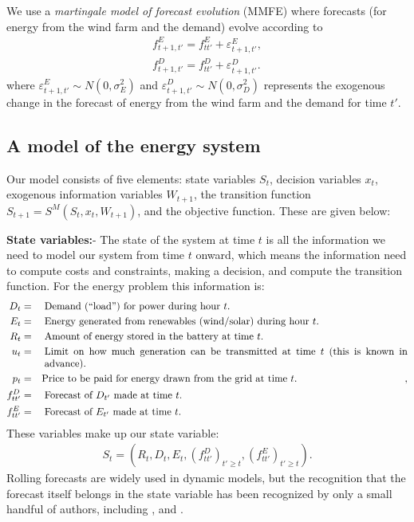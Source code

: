 \documentclass[11pt,oneside,fleqn,reqno,titlepage]{article}
\newcommand{\bn}{\begin{eqnarray}}
\newcommand{\en}{\end{eqnarray}}
\newcommand{\bns}{\begin{eqnarray*}}
\newcommand{\ens}{\end{eqnarray*}}
\newcommand{\textwrap}{\parbox[t]{5.0in}}
\begin{document}
\begin{figure}[b]
\end{figure}

We use a {\it martingale model of forecast evolution} (MMFE) \citep{Heath1994,Graves1986} where forecasts (for energy from the wind farm and the demand) evolve according to
\bn
f^E_{t+1,t'} = f^E_{tt'} + \varepsilon^E_{t+1,t'}, \label{eq:rollingforecastE}\\
f^D_{t+1,t'} = f^D_{tt'} + \varepsilon^D_{t+1,t'}. \label{eq:rollingforecastD}
\en
where $\varepsilon^E_{t+1,t'} \sim N(0,\sigma^2_E)$ and $\varepsilon^D_{t+1,t'} \sim N(0,\sigma^2_D)$ represents the exogenous change in the forecast of energy from the wind farm and the demand for time $t'$.


\subsection{A model of the energy system}

Our model consists of five elements: state variables $S_t$, decision variables $x_t$, exogenous information variables $W_{t+1}$, the transition function $S_{t+1}=S^M(S_t,x_t,W_{t+1})$, and the objective function.  These are given below:

{\noindent \bf State variables:}- The state of the system at time $t$ is all the information we need to model our system from time $t$ onward, which means the information need to compute costs and constraints, making a decision, and compute the transition function.  For the energy problem this information is:
\bns
D_t   &=& \textwrap{Demand (``load'') for power during hour $t$.}\\
E_t   &=& \textwrap{Energy generated from renewables (wind/solar) during hour $t$.}\\
R_t   &=& \textwrap{Amount of energy stored in the battery at time $t$.}\\
u_t   &=& \textwrap{Limit on how much generation can be transmitted at time $t$ (this is known in advance).}\\
p_t   &=& \textwrap{Price to be paid for energy drawn from the grid at time $t$.},\\
f^D_{tt'} &=& \textwrap{Forecast of $D_{t'}$ made at time $t$.}\\
f^E_{tt'} &=& \textwrap{Forecast of $E_{t'}$ made at time $t$.}
\ens
These variables make up our state variable:
\bns
S_t = (R_t, D_t, E_t,  (f^D_{tt'})_{t'\geq t}, (f^E_{tt'})_{t'\geq t}).
\ens
Rolling forecasts are widely used in dynamic models, but the recognition that the forecast itself belongs in the state variable has been recognized by only a small handful of authors, including \cite{Chen1999},\cite{Iida2006} and \cite{Lai2008}.
\end{document}
